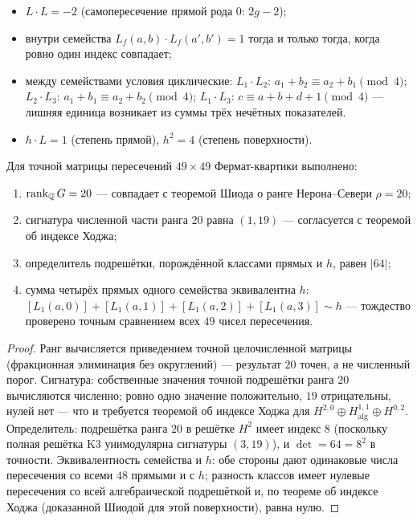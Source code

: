 \begin{itemize}[leftmargin=1.6em]
\item $L\cdot L=-2$ (самопересечение прямой рода $0$: $2g-2$);
\item внутри семейства $L_f(a,b)\cdot L_f(a',b')=1$ тогда и только
  тогда, когда ровно один индекс совпадает;
\item между семействами условия циклические: $L_1\cdot L_2$:
  $a_1+b_2\equiv a_2+b_1 \pmod 4$; $L_2\cdot L_3$: $a_1+b_1\equiv
  a_2+b_2 \pmod 4$; $L_1\cdot L_3$: $c\equiv a+b+d+1\pmod 4$ —
  лишняя единица возникает из суммы трёх нечётных показателей.
\item $h\cdot L=1$ (степень прямой), $h^2=4$ (степень поверхности).
\end{itemize}

\begin{theorem}\label{th:k3}
Для точной матрицы пересечений $49\times49$ Фермат-квартики выполнено:
\begin{enumerate}[leftmargin=2em, itemsep=0.15em]
\item $\operatorname{rank}_{\mathbb{Q}} G = 20$ — совпадает с теоремой Шиода о ранге
  Нерона--Севери $\rho=20$;
\item сигнатура численной части ранга $20$ равна $(1,19)$ —
  согласуется с теоремой об индексе Ходжа;
\item определитель подрешётки, порождённой классами прямых и $h$,
  равен $|64|$;
\item сумма четырёх прямых одного семейства эквивалентна $h$:
  $[L_1(a,0)]+[L_1(a,1)]+[L_1(a,2)]+[L_1(a,3)]\sim h$ — тождество
  проверено точным сравнением всех $49$ чисел пересечения.
\end{enumerate}
\end{theorem}

\begin{proof}
Ранг вычисляется приведением точной целочисленной матрицы
(фракционная элиминация без округлений) — результат $20$ точен, а не
численный порог. Сигнатура: собственные значения точной подрешётки
ранга $20$ вычисляются численно; ровно одно значение положительно,
$19$ отрицательны, нулей нет — что и требуется теоремой об индексе
Ходжа для $H^{2,0}\oplus H^{1,1}_{\mathrm{alg}}\oplus H^{0,2}$.
Определитель: подрешётка ранга $20$ в решётке $H^2$ имеет индекс
$8$ (поскольку полная решётка K3 унимодулярна сигнатуры $(3,19)$),
и $\det=64=8^2$ в точности. Эквивалентность семейства и $h$: обе
стороны дают одинаковые числа пересечения со всеми $48$ прямыми и
с $h$; разность классов имеет нулевые пересечения со всей
алгебраической подрешёткой и, по теореме об индексе Ходжа
(доказанной Шиодой для этой поверхности), равна нулю.
\end{proof}

